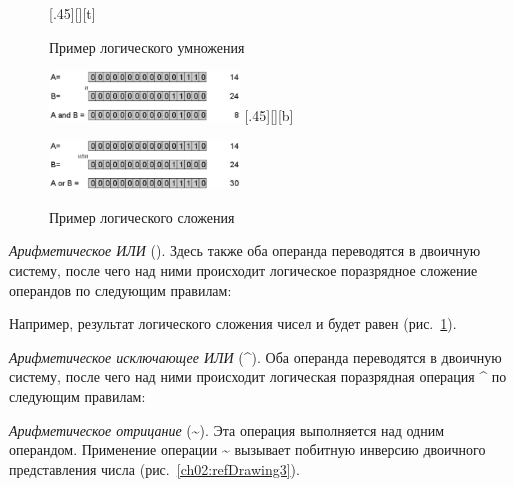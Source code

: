 \begin{figure}[H]
\begin{floatrow}
[.45\textwidth][\FBheight][t]
{\caption{Пример логического умножения}
\label{ch02:refDrawing1}}
{\includegraphics[width=0.45\textwidth,keepaspectratio]{img/ris_2_2}}\hspace*{0.05\textwidth}
%
[.45\textwidth][\FBheight][b]
{\caption{Пример логического сложения}
\label{ch02:refDrawing2}}
{\includegraphics[width=0.45\textwidth,keepaspectratio]{img/ris_2_3}}
\end{floatrow}
\end{figure}


\emph{Арифметическое ИЛИ} ({\textbar}). Здесь также оба операнда переводятся в двоичную
систему, после чего над ними происходит логическое поразрядное сложение операндов по следующим правилам:


Например, результат логического сложения чисел  и  будет равен  
(рис.~\ref{ch02:refDrawing2}). 


\emph{Арифметическое исключающее ИЛИ} (\^{}). Оба операнда переводятся в двоичную
систему, после чего над ними происходит логическая поразрядная операция \^{} по следующим правилам:


\emph{Арифметическое отрицание} (\~{}). Эта операция выполняется над одним операндом.
Применение операции \~{} вызывает побитную инверсию двоичного представления числа 
(рис.~\ref{ch02:refDrawing3}).


